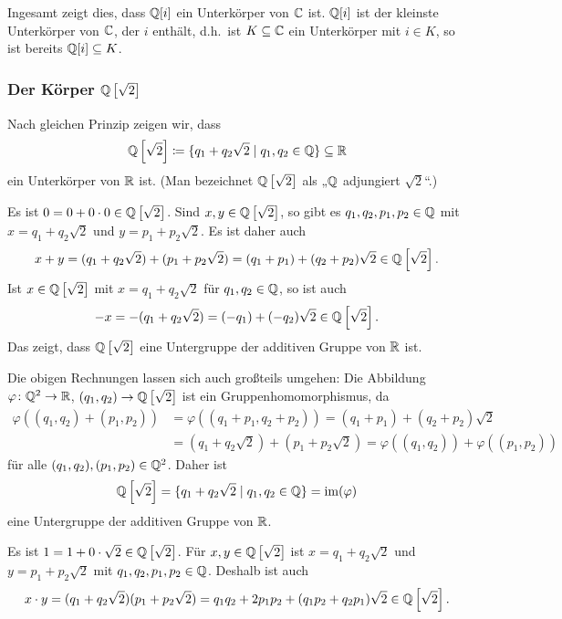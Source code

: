 Ingesamt zeigt dies, dass $\mathbb{Q}[i]$ ein Unterkörper von $\mathbb{C}$ ist. $\mathbb{Q}[i]$ ist der kleinste Unterkörper von $\mathbb{C}$, der $i$ enthält, d.h.\ ist $K \subseteq \mathbb{C}$ ein Unterkörper mit $i \in K$, so ist bereits $\mathbb{Q}[i] \subseteq K$.



\subsubsection{Der Körper \texorpdfstring{$\mathbb{Q}\left[\sqrt{2}\right]$}{Q[sqrt(2)]}}
Nach gleichen Prinzip zeigen wir, dass
\[
 \mathbb{Q}\left[\sqrt{2}\right] \coloneqq \{ q_1 + q_2 \sqrt{2} \mid q_1, q_2 \in \mathbb{Q} \} \subseteq \mathbb{R}
\]
ein Unterkörper von $\mathbb{R}$ ist. (Man bezeichnet $\mathbb{Q}\left[\sqrt{2}\right]$ als „$\mathbb{Q}$ adjungiert $\sqrt{2}$“.)

Es ist $0 = 0 + 0 \cdot 0 \in \mathbb{Q}\left[\sqrt{2}\right]$. Sind $x,y \in \mathbb{Q}\left[\sqrt{2}\right]$, so gibt es $q_1, q_2, p_1, p_2 \in \mathbb{Q}$ mit $x = q_1 + q_2 \sqrt{2}$ und $y = p_1 + p_2 \sqrt{2}$. Es ist daher auch
\[
 x+y
 = (q_1 + q_2 \sqrt{2}) + (p_1 + p_2 \sqrt{2})
 = (q_1 + p_1) + (q_2 + p_2) \sqrt{2}
 \in \mathbb{Q}\left[\sqrt{2}\right].
\]
Ist $x \in \mathbb{Q}\left[\sqrt{2}\right]$ mit $x = q_1 + q_2 \sqrt{2}$ für $q_1, q_2 \in \mathbb{Q}$, so ist auch
\[
 -x = -(q_1 + q_2 \sqrt{2}) = (-q_1) + (-q_2) \sqrt{2} \in \mathbb{Q}\left[\sqrt{2}\right].
\]
Das zeigt, dass $\mathbb{Q}\left[\sqrt{2}\right]$ eine Untergruppe der additiven Gruppe von $\mathbb{R}$ ist.

\begin{bem}
 Die obigen Rechnungen lassen sich auch großteils umgehen: Die Abbildung $\varphi \colon \mathbb{Q}^2 \to \mathbb{R}$, $(q_1, q_2) \to \mathbb{Q}\left[\sqrt{2}\right]$ ist ein Gruppenhomomorphismus, da
 \begin{align*}
  \varphi( (q_1, q_2) + (p_1, p_2) )
  &= \varphi( (q_1 + p_1, q_2 + p_2) )
  = (q_1 + p_1) + (q_2 + p_2) \sqrt{2} \\
  &= (q_1 +  q_2 \sqrt{2}) + (p_1 + p_2 \sqrt{2})
  = \varphi((q_1, q_2)) + \varphi((p_1,p_2))
 \end{align*}
 für alle $(q_1, q_2), (p_1, p_2) \in \mathbb{Q}^2$. Daher ist
 \[
  \mathbb{Q}\left[\sqrt{2}\right]
  = \{q_1 + q_2 \sqrt{2} \mid q_1, q_2 \in \mathbb{Q}\}
  = \mathrm{im}(\varphi)
 \]
 eine Untergruppe der additiven Gruppe von $\mathbb{R}$.
\end{bem}

Es ist $1 = 1 + 0 \cdot \sqrt{2} \in \mathbb{Q}\left[\sqrt{2}\right]$. Für $x, y \in \mathbb{Q}\left[\sqrt{2}\right]$ ist $x = q_1 + q_2 \sqrt{2}$ und $y = p_1 + p_2 \sqrt{2}$ mit $q_1, q_2, p_1, p_2 \in \mathbb{Q}$. Deshalb ist auch
\[
 x \cdot y
 = (q_1 + q_2 \sqrt{2}) (p_1 + p_2 \sqrt{2})
 = q_1 q_2 + 2 p_1 p_2 + (q_1 p_2 + q_2 p_1) \sqrt{2} \in \mathbb{Q}\left[\sqrt{2}\right].
\]

